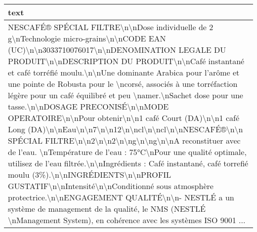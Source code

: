 \begin{tabular}{p{\linewidth}}
\toprule
                                                                                                                                                                                                                                                                                                                                                                                                                                                                                                                                                                                                                                                                                                                                                                                                                                                                                                                                                                                                                                    text \\
\midrule
 NESCAFÉ® SPÉCIAL FILTRE\textbackslash n\textbackslash nDose individuelle de 2 g\textbackslash nTechnologie micro-grains\textbackslash n\textbackslash nCODE EAN (UC)\textbackslash n\textbackslash n3033710076017\textbackslash n\textbackslash nDENOMINATION LEGALE DU PRODUIT\textbackslash n\textbackslash nDESCRIPTION DU PRODUIT\textbackslash n\textbackslash nCafé instantané et café torréfié moulu.\textbackslash n\textbackslash nUne dominante Arabica pour l'arôme et une pointe de Robusta pour le \textbackslash ncorsé, associés à une torréfaction légère pour un café équilibré et peu \textbackslash namer.\textbackslash nSachet dose pour une tasse.\textbackslash n\textbackslash nDOSAGE PRECONISÉ\textbackslash n\textbackslash nMODE OPERATOIRE\textbackslash n\textbackslash nPour obtenir\textbackslash n\textbackslash n1 café Court (DA)\textbackslash n\textbackslash n1 café Long (DA)\textbackslash n\textbackslash nEau\textbackslash n\textbackslash n7\textbackslash n\textbackslash n12\textbackslash n\textbackslash ncl\textbackslash n\textbackslash ncl\textbackslash n\textbackslash nNESCAFÉ®\textbackslash n\textbackslash n SPÉCIAL FILTRE\textbackslash n\textbackslash n2\textbackslash n\textbackslash n2\textbackslash n\textbackslash ng\textbackslash n\textbackslash ng\textbackslash n\textbackslash nA reconstituer avec de l'eau. \textbackslash nTempérature de l'eau : 75°C\textbackslash nPour une qualité optimale, utilisez de l'eau filtrée.\textbackslash n\textbackslash nIngrédients : Café instantané, café torrefié moulu (3\%).\textbackslash n\textbackslash nINGRÉDIENTS\textbackslash n\textbackslash nPROFIL GUSTATIF\textbackslash n\textbackslash nIntensité\textbackslash n\textbackslash nConditionné sous atmosphère protectrice.\textbackslash n\textbackslash nENGAGEMENT QUALITÉ\textbackslash n\textbackslash n- NESTLÉ a un système de management de la qualité, le NMS (NESTLÉ \textbackslash nManagement System), en cohérence avec les systèmes ISO 9001 ... \\

\end{tabular}
